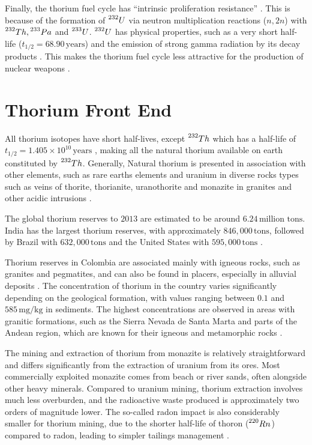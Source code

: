Finally, the thorium fuel cycle has ``intrinsic proliferation resistance'' \cite{IAEA_Th_Potential}. This is because of the formation of \(\prescript{232}{}{U}\) via neutron multiplication reactions (\(n,2n\)) with \(\prescript{232}{}{Th}, \prescript{233}{}{Pa}\) and \(\prescript{233}{}{U}\). \(\prescript{232}{}{U}\) has physical properties, such as a very short half-life (\(t_{1/2} = 68.90 \, \text{years} \)) and the emission of strong gamma radiation by its decay products \cite{IAEA_Th_Potential,NNDC}. This makes the thorium fuel cycle less attractive for the production of nuclear weapons \cite{IAEA_Th_Potential}.

\section{Thorium Front End}

All thorium isotopes have short half-lives, except \(\prescript{232}{}{Th}\) which has a half-life of \(t_{1/2} = 1.405 \times 10^{10} \, \text{years}\) \cite{NNDC}, making all the natural thorium available on earth constituted by \(\prescript{232}{}{Th}\). Generally, Natural thorium is presented in association with other elements, such as rare earths elements and uranium in diverse rocks types such as veins of thorite, thorianite, uranothorite and  monazite in granites and other acidic intrusions \cite{IAEA_Th_Potential}. 

The global thorium reserves to \(2013\) are estimated to be around \(6.24 \, \text{million tons}\). India has the largest thorium reserves, with approximately \(846,000 \, \text{tons}\), followed by Brazil with \(632,000 \, \text{tons}\) and the United States with \(595,000 \, \text{tons}\) \cite{Th_cycle_viability}.

Thorium reserves in Colombia are associated mainly with igneous rocks, such as granites and pegmatites, and can also be found in placers, especially in alluvial deposits \cite{Th_Colombia}. The concentration of thorium in the country varies significantly depending on the geological formation, with values ranging between \(0.1\) and \(585 \, \text{mg}/\text{kg}\) in sediments. The highest concentrations are observed in areas with granitic formations, such as the Sierra Nevada de Santa Marta and parts of the Andean region, which are known for their igneous and metamorphic rocks \cite{Th_Colombia}. 

The mining and extraction of thorium from monazite is relatively straightforward and differs significantly from the extraction of uranium from its ores. Most commercially exploited monazite comes from beach or river sands, often alongside other heavy minerals. Compared to uranium mining, thorium extraction involves much less overburden, and the radioactive waste produced is approximately two orders of magnitude lower. The so-called radon impact is also considerably smaller for thorium mining, due to the shorter half-life of thoron (\(\prescript{220}{}{Rn}\)) compared to radon, leading to simpler tailings management \cite{IAEA_Th_Potential,Thoron}.

